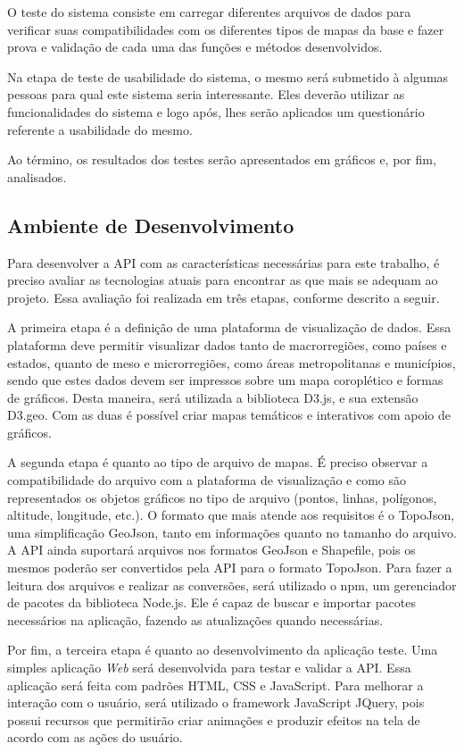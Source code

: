 \documentclass[12pt]{article}
\begin{document}
O teste do sistema consiste em carregar diferentes arquivos de dados para verificar suas compatibilidades com os diferentes tipos de mapas da base e fazer prova e validação de cada uma das funções e métodos desenvolvidos.

Na etapa de teste de usabilidade do sistema, o mesmo será submetido à algumas pessoas para qual este sistema seria interessante. Eles deverão utilizar as funcionalidades do sistema e logo após, lhes serão aplicados um questionário referente a usabilidade do mesmo.

Ao término, os resultados dos testes serão apresentados em gráficos e, por fim, analisados.

\subsection{Ambiente de Desenvolvimento} \label{tecnologias}

Para desenvolver a API com as características necessárias para este trabalho, é preciso avaliar as tecnologias atuais para encontrar as que mais se adequam ao projeto. Essa avaliação foi realizada em três etapas, conforme descrito a seguir.

A primeira etapa é a definição de uma plataforma de visualização de dados. Essa plataforma deve permitir visualizar dados tanto de macrorregiões, como países e estados, quanto de meso e microrregiões, como áreas metropolitanas e municípios, sendo que estes dados devem ser impressos sobre um mapa coroplético e formas de gráficos. Desta maneira, será utilizada a biblioteca D3.js, e sua extensão D3.geo. Com as duas é possível criar mapas temáticos e interativos com apoio de gráficos.

A segunda etapa é quanto ao tipo de arquivo de mapas. É preciso observar a compatibilidade do arquivo com a plataforma de visualização e como são representados os objetos gráficos no tipo de arquivo (pontos, linhas, polígonos, altitude, longitude, etc.). O formato que mais atende aos requisitos é o TopoJson, uma simplificação GeoJson, tanto em informações quanto no tamanho do arquivo. A API ainda suportará arquivos nos formatos GeoJson e Shapefile, pois os mesmos poderão ser convertidos pela API para o formato TopoJson. Para fazer a leitura dos arquivos e realizar as conversões, será utilizado o npm, um gerenciador de pacotes da biblioteca Node.js. Ele é capaz de buscar e importar pacotes necessários na aplicação, fazendo as atualizações quando necessárias.

Por fim, a terceira etapa é quanto ao desenvolvimento da aplicação teste. Uma simples aplicação \emph{Web} será desenvolvida para testar e validar a API. Essa aplicação será feita com padrões HTML, CSS e JavaScript. Para melhorar a interação com o usuário, será utilizado o framework JavaScript JQuery, pois possui recursos que permitirão criar animações e produzir efeitos na tela de acordo com as ações do usuário.
\end{document}
